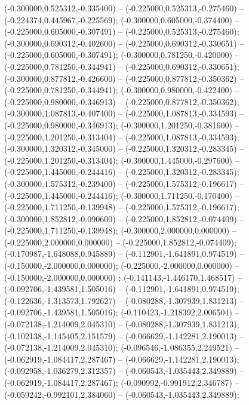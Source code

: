  (-0.300000,0.525312,-0.335400) -- (-0.225000,0.525313,-0.275460) -- (-0.224374,0.445967,-0.225569);
 (-0.300000,0.605000,-0.374400) -- (-0.225000,0.605000,-0.307491) -- (-0.225000,0.525313,-0.275460);
 (-0.300000,0.690312,-0.402600) -- (-0.225000,0.690312,-0.330651) -- (-0.225000,0.605000,-0.307491);
 (-0.300000,0.781250,-0.420000) -- (-0.225000,0.781250,-0.344941) -- (-0.225000,0.690312,-0.330651);
 (-0.300000,0.877812,-0.426600) -- (-0.225000,0.877812,-0.350362) -- (-0.225000,0.781250,-0.344941);
 (-0.300000,0.980000,-0.422400) -- (-0.225000,0.980000,-0.346913) -- (-0.225000,0.877812,-0.350362);
 (-0.300000,1.087813,-0.407400) -- (-0.225000,1.087813,-0.334593) -- (-0.225000,0.980000,-0.346913);
 (-0.300000,1.201250,-0.381600) -- (-0.225000,1.201250,-0.313404) -- (-0.225000,1.087813,-0.334593);
 (-0.300000,1.320312,-0.345000) -- (-0.225000,1.320312,-0.283345) -- (-0.225000,1.201250,-0.313404);
 (-0.300000,1.445000,-0.297600) -- (-0.225000,1.445000,-0.244416) -- (-0.225000,1.320312,-0.283345);
 (-0.300000,1.575312,-0.239400) -- (-0.225000,1.575312,-0.196617) -- (-0.225000,1.445000,-0.244416);
 (-0.300000,1.711250,-0.170400) -- (-0.225000,1.711250,-0.139948) -- (-0.225000,1.575312,-0.196617);
 (-0.300000,1.852812,-0.090600) -- (-0.225000,1.852812,-0.074409) -- (-0.225000,1.711250,-0.139948);
 (-0.300000,2.000000,0.000000) -- (-0.225000,2.000000,0.000000) -- (-0.225000,1.852812,-0.074409);
 (-0.170987,-1.648088,0.945889) -- (-0.112901,-1.641891,0.974519) -- (-0.150000,-2.000000,0.000000);
 (-0.225000,-2.000000,0.000000) -- (-0.150000,-2.000000,0.000000) ;
 (-0.141143,-1.446170,1.468517) -- (-0.092706,-1.439581,1.505016) -- (-0.112901,-1.641891,0.974519);
 (-0.122636,-1.313573,1.792627) -- (-0.080288,-1.307939,1.831213) -- (-0.092706,-1.439581,1.505016);
 (-0.110423,-1.218392,2.006504) -- (-0.072138,-1.214009,2.045310) -- (-0.080288,-1.307939,1.831213);
 (-0.102138,-1.145405,2.151579) -- (-0.066629,-1.142281,2.190013) -- (-0.072138,-1.214009,2.045310);
 (-0.096546,-1.086355,2.249521) -- (-0.062919,-1.084417,2.287467) -- (-0.066629,-1.142281,2.190013);
 (-0.092958,-1.036279,2.312357) -- (-0.060543,-1.035443,2.349889) -- (-0.062919,-1.084417,2.287467);
 (-0.090992,-0.991912,2.346787) -- (-0.059242,-0.992101,2.384060) -- (-0.060543,-1.035443,2.349889);
